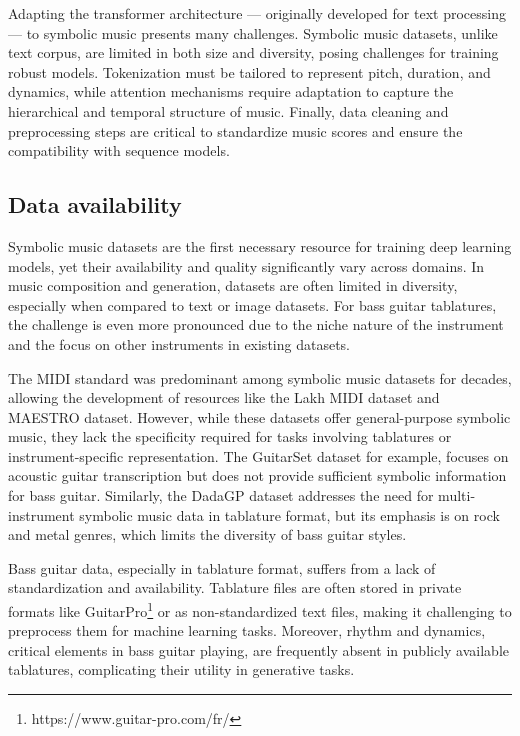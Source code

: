 Adapting the transformer architecture — originally developed for text processing — to symbolic music presents many challenges.
Symbolic music datasets, unlike text corpus, are limited in both size and diversity, posing challenges for training robust models\cite{le_natural_2024}.
Tokenization must be tailored to represent pitch, duration, and dynamics, while attention mechanisms require adaptation to capture the hierarchical and temporal structure of music.
Finally, data cleaning and preprocessing steps are critical to standardize music scores and ensure the compatibility with sequence models.


\subsection{Data availability}


Symbolic music datasets are the first necessary resource for training deep learning models, yet their availability and quality significantly vary across domains.
In music composition and generation, datasets are often limited in diversity, especially when compared to text or image datasets.
For bass guitar tablatures, the challenge is even more pronounced due to the niche nature of the instrument and the focus on other instruments in existing datasets.

The MIDI standard was predominant among symbolic music datasets for decades, allowing the development of resources like the Lakh MIDI dataset\cite{raffel_learning-based_2016} and MAESTRO dataset\cite{hawthorne_enabling_2018}.
However, while these datasets offer general-purpose symbolic music, they lack the specificity required for tasks involving tablatures or instrument-specific representation.
The GuitarSet dataset\cite{xi_guitarset_2018} for example, focuses on acoustic guitar transcription but does not provide sufficient symbolic information for bass guitar.
Similarly, the DadaGP dataset\cite{sarmento_dadagp_2021} addresses the need for multi-instrument symbolic music data in tablature format, but its emphasis is on rock and metal genres, which limits the diversity of bass guitar styles.


Bass guitar data, especially in tablature format, suffers from a lack of standardization and availability.
Tablature files are often stored in private formats like GuitarPro\footnote{https://www.guitar-pro.com/fr/} or as non-standardized text files, making it challenging to preprocess them for machine learning tasks.
Moreover, rhythm and dynamics, critical elements in bass guitar playing, are frequently absent in publicly available tablatures, complicating their utility in generative tasks.


